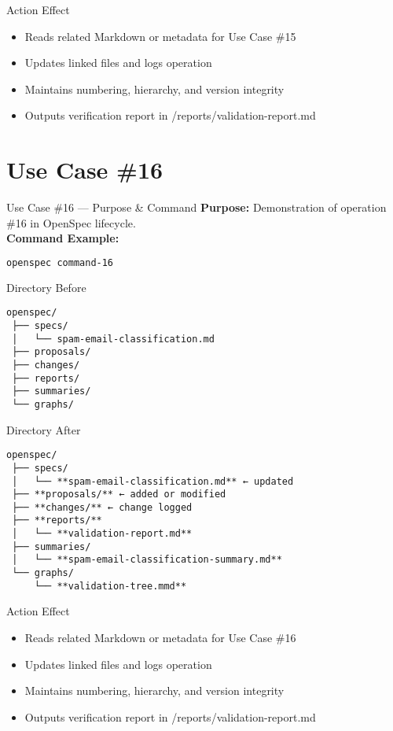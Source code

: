 \documentclass[aspectratio=169]{beamer}
\begin{document}
\begin{frame}{Action Effect}
\begin{itemize}
  \item Reads related Markdown or metadata for Use Case \#15
  \item Updates linked files and logs operation
  \item Maintains numbering, hierarchy, and version integrity
  \item Outputs verification report in /reports/validation-report.md
\end{itemize}
\end{frame}

\section*{Use Case \#16}
\begin{frame}{Use Case \#16 --- Purpose \& Command}
\textbf{Purpose:} Demonstration of operation \#16 in OpenSpec lifecycle.\\[4pt]
\textbf{Command Example:}
\begin{lstlisting}[language=bash]
openspec command-16
\end{lstlisting}
\end{frame}

\begin{frame}{Directory Before}
\begin{lstlisting}
openspec/
 ├── specs/
 │   └── spam-email-classification.md
 ├── proposals/
 ├── changes/
 ├── reports/
 ├── summaries/
 └── graphs/
\end{lstlisting}
\end{frame}

\begin{frame}{Directory After}
\begin{lstlisting}
openspec/
 ├── specs/
 │   └── **spam-email-classification.md** ← updated
 ├── **proposals/** ← added or modified
 ├── **changes/** ← change logged
 ├── **reports/**
 │   └── **validation-report.md**
 ├── summaries/
 │   └── **spam-email-classification-summary.md**
 └── graphs/
     └── **validation-tree.mmd**
\end{lstlisting}
\end{frame}

\begin{frame}{Action Effect}
\begin{itemize}
  \item Reads related Markdown or metadata for Use Case \#16
  \item Updates linked files and logs operation
  \item Maintains numbering, hierarchy, and version integrity
  \item Outputs verification report in /reports/validation-report.md
\end{itemize}
\end{frame}
\end{document}
